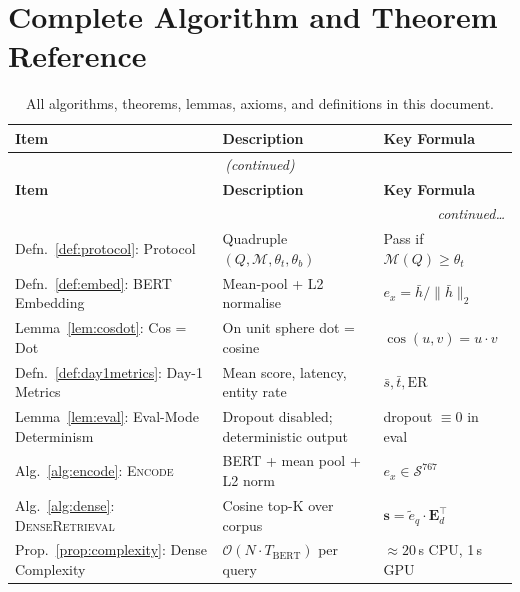 \documentclass[12pt,a4paper]{article}
\theoremstyle{definition}
\theoremstyle{plain}
\theoremstyle{remark}
\begin{document}
\newpage
\section{Complete Algorithm and Theorem Reference}

\begin{longtable}{p{4.5cm} p{5.5cm} p{4.2cm}}
\caption{All algorithms, theorems, lemmas, axioms, and definitions in this document.}
\label{tab:ref}\\
\toprule
\textbf{Item} & \textbf{Description} & \textbf{Key Formula} \\
\midrule
\endfirsthead
\multicolumn{3}{c}{\small\itshape (continued)}\\
\toprule
\textbf{Item} & \textbf{Description} & \textbf{Key Formula} \\
\midrule
\endhead
\midrule\multicolumn{3}{r}{\small\itshape continued\ldots}\\
\endfoot
\bottomrule
\endlastfoot

Defn.~\ref{def:protocol}: Protocol
  & Quadruple $(Q,\mathcal{M},\theta_t,\theta_b)$
  & Pass if $\mathcal{M}(Q)\geq\theta_t$ \\[3pt]

Defn.~\ref{def:embed}: BERT Embedding
  & Mean-pool + L2 normalise
  & $e_x = \bar{h}/\|\bar{h}\|_2$ \\[3pt]

Lemma~\ref{lem:cosdot}: Cos = Dot
  & On unit sphere dot = cosine
  & $\cos(u,v) = u\cdot v$ \\[3pt]

Defn.~\ref{def:day1metrics}: Day-1 Metrics
  & Mean score, latency, entity rate
  & $\bar{s},\bar{t},\mathrm{ER}$ \\[3pt]

Lemma~\ref{lem:eval}: Eval-Mode Determinism
  & Dropout disabled; deterministic output
  & dropout $\equiv 0$ in eval \\[3pt]

Alg.~\ref{alg:encode}: \textsc{Encode}
  & BERT + mean pool + L2 norm
  & $e_x \in \mathcal{S}^{767}$ \\[3pt]

Alg.~\ref{alg:dense}: \textsc{DenseRetrieval}
  & Cosine top-K over corpus
  & $\bm{s}=\tilde{e}_q\cdot\mathbf{E}_d^\top$ \\[3pt]

Prop.~\ref{prop:complexity}: Dense Complexity
  & $\mathcal{O}(N\cdot T_\text{BERT})$ per query
  & $\approx 20$\,s CPU, 1\,s GPU \\[3pt]


\end{longtable}
\end{document}
